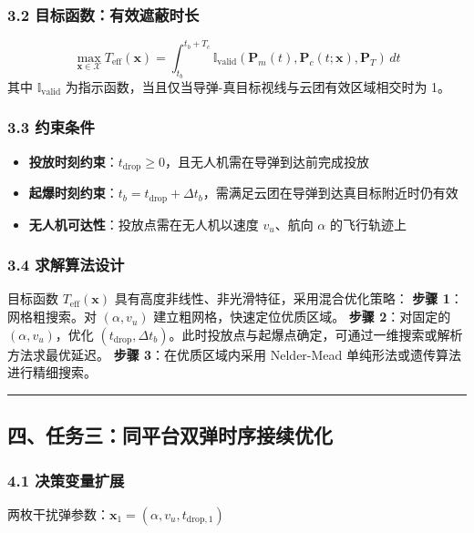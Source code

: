 \documentclass{JXUSTmodeling}
\begin{document}
\subsubsection{3.2 目标函数：有效遮蔽时长}
\begin{equation}
\max_{\mathbf{x} \in \mathcal{X}} T_{\text{eff}}(\mathbf{x}) = \int_{t_b}^{t_b+T_c} \mathbb{I}_{\text{valid}}(\mathbf{P}_m(t), \mathbf{P}_c(t; \mathbf{x}), \mathbf{P}_T) \, dt \tag{14}
\end{equation}
其中 $\mathbb{I}_{\text{valid}}$ 为指示函数，当且仅当导弹-真目标视线与云团有效区域相交时为 1。
\subsubsection{3.3 约束条件}
\begin{itemize}
  \item \textbf{投放时刻约束}：$t_{\text{drop}} \geq 0$，且无人机需在导弹到达前完成投放
  \item \textbf{起爆时刻约束}：$t_b = t_{\text{drop}} + \Delta t_b$，需满足云团在导弹到达真目标附近时仍有效
  \item \textbf{无人机可达性}：投放点需在无人机以速度 $v_u$、航向 $\alpha$ 的飞行轨迹上
\end{itemize}
\subsubsection{3.4 求解算法设计}
目标函数 $T_{\text{eff}}(\mathbf{x})$ 具有高度非线性、非光滑特征，采用混合优化策略：
\textbf{步骤 1}：网格粗搜索。对 $(\alpha, v_u)$ 建立粗网格，快速定位优质区域。
\textbf{步骤 2}：对固定的 $(\alpha, v_u)$，优化 $(t_{\text{drop}}, \Delta t_b)$。此时投放点与起爆点确定，可通过一维搜索或解析方法求最优延迟。
\textbf{步骤 3}：在优质区域内采用 Nelder-Mead 单纯形法或遗传算法进行精细搜索。
\noindent\rule{\textwidth}{0.4pt}
\subsection{四、任务三：同平台双弹时序接续优化}
\subsubsection{4.1 决策变量扩展}
两枚干扰弹参数：$\mathbf{x}_1 = (\alpha, v_u, t_{\text{drop},1})$
\end{document}
